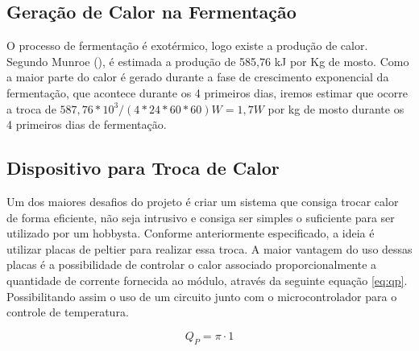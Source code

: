 \subsection{Geração de Calor na Fermentação}

O processo de fermentação é exotérmico, logo existe a produção de calor. Segundo Munroe (), é estimada a produção de 585,76 kJ por Kg de mosto. Como a maior parte do calor é gerado durante a fase de crescimento exponencial da fermentação, que acontece durante os 4 primeiros dias, iremos estimar que ocorre a troca de \(587,76 * 10^3 / (4*24*60*60)W = 1,7 W\) por kg de mosto durante os 4 primeiros dias de fermentação.   

\subsection{Dispositivo para Troca de Calor}

Um dos maiores desafios do projeto é criar um sistema que consiga trocar calor de forma eficiente, não seja intrusivo e consiga ser simples o suficiente para ser utilizado por um hobbysta. Conforme anteriormente especificado, a ideia é utilizar placas de peltier para realizar essa troca. A maior vantagem do uso dessas placas é a possibilidade de controlar o calor associado proporcionalmente a quantidade de corrente fornecida ao módulo, através da seguinte equação \ref{eq:qp}. Possibilitando assim o uso de um circuito junto com o microcontrolador para o controle de temperatura.

\begin{equation}
    Q_P = \pi \cdot 1
    \label{eq:qp}
\end{equation}



